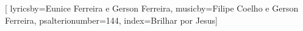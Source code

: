 


\setcounter{songnum}{144}

[
lyricsby={Eunice Ferreira e Gerson Ferreira},
musicby={Filipe Coelho e Gerson Ferreira},
psalterionumber=144,
index={Brilhar por Jesus}]


